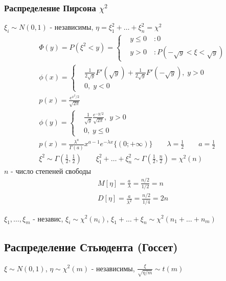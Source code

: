 \documentclass{article}
\begin{document}
\subsubsection[Распределение Пирсона]{Распределение Пирсона $\chi^2$}
$\xi_i\sim N(0,1)$ - независимы, $\eta=\xi_1^2+\dots+\xi_n^2=\chi^2$
\begin{gather*}
  \Phi(y)=P(\xi^2<y)=\left\{\begin{aligned}
    & y\le0 \quad :0 \\
    & y > 0 \quad :P(-\sqrt{y}<\xi<\sqrt{y})
  \end{aligned}\right. \\
  \phi(x)=   \left\{\begin{aligned}
      & \frac{1}{2\sqrt{y}}F'(\sqrt{y})+\frac{1}{2\sqrt{y}}F'(-\sqrt{y}), \; y> 0 \\
      & 0, \; y<0
    \end{aligned}\right. \\
  p(x)=\frac{e^{x^2/2}}{\sqrt{2\pi}} \\
  \phi(y)=\left\{\begin{aligned}
    & \frac{1}{\sqrt{y}}\frac{e^{-y/2}}{\sqrt{2\pi}}, \; y>0  \\
    & 0, \; y\le 0
  \end{aligned}\right. \\
  p(x)=\frac{\lambda^{a}}{\Gamma(a)}x^{a-1}e^{-\lambda x}\{(0;+\infty)\} \qquad \lambda=\frac{1}{2} \qquad a=\frac{1}{2} \\
  \xi^{2}\sim \Gamma(\frac{1}{2}, \frac{1}{2}) \qquad \xi_1^{2}+\dots+\xi_n^{2} \sim \Gamma(\frac{1}{2}, \frac{n}{2})=\chi^{2}(n)
\end{gather*}
$n$ - число степеней свободы
\begin{gather*}
  M[\eta]=\frac{a}{\lambda}=\frac{n/2}{1/2}=n \\
  D[\eta]=\frac{a}{\lambda^{2}}=\frac{n/2}{1/4}=2n
\end{gather*}

\begin{theorem}
  $\xi_1,\dots,\xi_m$ - независ, $\xi_i\sim \chi^{2}(n_i)$, $\xi_1+\dots+\xi_n\sim \chi^2(n_1+\dots+n_m)$
\end{theorem}

\subsection{Распределение Стьюдента (Госсет)}
$\xi \sim N(0,1)$, $\eta \sim \chi^2(m)$ - независимы, $\frac{\xi}{\sqrt{\eta/m}}\sim t(m)$
\end{document}
